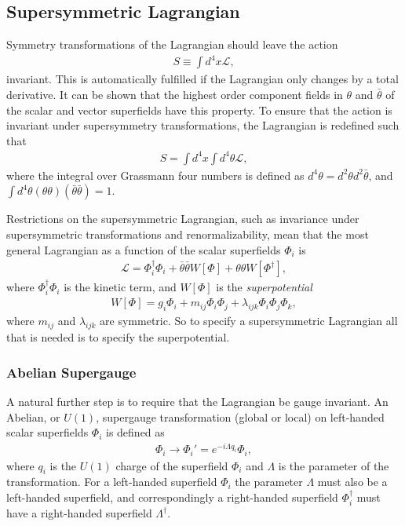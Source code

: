 \documentclass[twoside,english]{uiofysmaster}
\begin{document}
\subsection{Supersymmetric Lagrangian}

Symmetry transformations of the Lagrangian should leave the action
\begin{align}
S \equiv \int d^4x \mathcal{L},
\end{align}
 invariant. This is automatically fulfilled if the Lagrangian only changes by a total derivative. It can be shown that the highest order component fields in $\theta$ and $\bar{\theta}$ of the scalar and vector superfields have this property. To ensure that the action is invariant under supersymmetry transformations, the Lagrangian is redefined such that
\begin{align}
S = \int d^4x \int d^4 \theta \mathcal{L},
\end{align}
where the integral over Grassmann four numbers is defined as $d^4 \theta = d^2 \theta d^2 \bar{\theta}$, and $\int d^4 \theta (\theta \theta ) (\bar{\theta} \bar{\theta})=1$.

Restrictions on the supersymmetric Lagrangian, such as invariance under supersymmetric transformations and renormalizability, mean that the most general Lagrangian as a function of the scalar superfields $\Phi_i$ is
\begin{align}
\mathcal{L} = \Phi_i^{\dagger} \Phi_i + \bar{\theta} \bar{\theta} W[\Phi] + \theta \theta W[\Phi^{\dagger}],
\end{align}
where $\Phi_i^{\dagger} \Phi_i$ is the kinetic term, and $W[\Phi]$ is the \textit{superpotential}
\begin{align}\label{Eq:: superpotential}
W[\Phi] = g_i \Phi_i + m_{ij} \Phi_i \Phi_j + \lambda_{ijk} \Phi_i \Phi_j \Phi_k,
\end{align}
where $m_{ij}$ and $\lambda_{ijk}$ are symmetric. So to specify a supersymmetric Lagrangian all that is needed is to specify the superpotential. 

\subsubsection{Abelian Supergauge}

A natural further step is to require that the Lagrangian be gauge invariant. An Abelian, or $U(1)$, supergauge transformation (global or local) on left-handed scalar superfields $\Phi_i$ is defined as \cite{batzing2017lecture} 
\begin{align}
\Phi_i \rightarrow \Phi_i' = e^{-i \Lambda q_i} \Phi_i,
\end{align} 
where $q_i$ is the $U(1)$ charge of the superfield $\Phi_i$ and $\Lambda$ is the parameter of the transformation. For a left-handed superfield $\Phi_i$ the parameter $\Lambda$ must also be a left-handed superfield, and correspondingly a right-handed superfield $\Phi^{\dagger}_i$ must have a right-handed superfield $\Lambda^{\dagger}$. 
\end{document}
